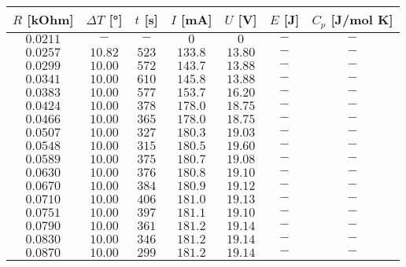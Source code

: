 \begin{table}
[H]
\begin{tabular}{ccccccc}

  \toprule
$R$ [kOhm] & $\Delta T$ [°] & $t$ [s] & $I$ [mA] & $U$ [V] & $E$ [J] & $C_p$ [J/mol K]\\

\midrule
$0.0211$ & $-    $ & $ - $ & $0    $ & $0    $ & $-$ & $-$ \\

$0.0257$ & $10.82$ & $523$ & $133.8$ & $13.80$ & $-$ & $-$ \\

$0.0299$ & $10.00$ & $572$ & $143.7$ & $13.88$ & $-$ & $-$ \\
$0.0341$ & $10.00$ & $610$ & $145.8$ & $13.88$ & $-$ & $-$ \\
$0.0383$ & $10.00$ & $577$ & $153.7$ & $16.20$ & $-$ & $-$ \\

$0.0424$ & $10.00$ & $378$ & $178.0$ & $18.75$ & $-$ & $-$ \\

$0.0466$ & $10.00$ & $365$ & $178.0$ & $18.75$ & $-$ & $-$ \\

$0.0507$ & $10.00$ & $327$ & $180.3$ & $19.03$ & $-$ & $-$ \\

$0.0548$ & $10.00$ & $315$ & $180.5$ & $19.60$ & $-$ & $-$ \\

$0.0589$ & $10.00$ & $375$ & $180.7$ & $19.08$ & $-$ & $-$ \\

$0.0630$ & $10.00$ & $376$ & $180.8$ & $19.10$ & $-$ & $-$ \\

$0.0670$ & $10.00$ & $384$ & $180.9$ & $19.12$ & $-$ & $-$ \\

$0.0710$ & $10.00$ & $406$ & $181.0$ & $19.13$ & $-$ & $-$ \\

$0.0751$ & $10.00$ & $397$ & $181.1$ & $19.10$ & $-$ & $-$ \\

$0.0790$ & $10.00$ & $361$ & $181.2$ & $19.14$ & $-$ & $-$ \\

$0.0830$ & $10.00$ & $346$ & $181.2$ & $19.14$ & $-$ & $-$ \\

$0.0870$ & $10.00$ & $299$ & $181.2$ & $19.14$ & $-$ & $-$ \\


\end{tabular}
\end{table}
